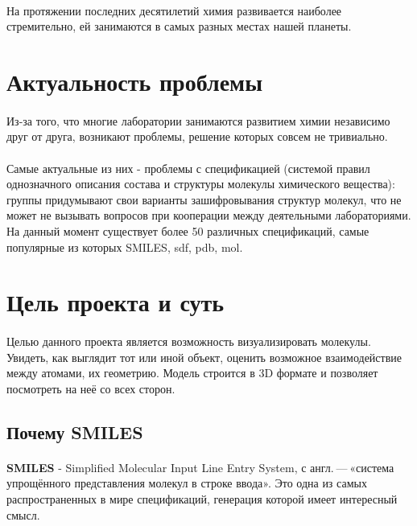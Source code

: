 \documentclass[a4paper,12pt]{article}
\begin{document}
\paragraph{} На протяжении последних десятилетий химия развивается наиболее стремительно, ей занимаются в самых разных местах нашей планеты.

\section{Актуальность проблемы}
\paragraph{} Из-за того, что многие лаборатории занимаются развитием химии независимо друг от друга, возникают проблемы, решение которых совсем не тривиально. 
\paragraph{} Самые актуальные из них - проблемы с спецификацией (системой правил однозначного описания состава и структуры молекулы химического вещества): группы придумывают свои варианты зашифровывания структур молекул, что не может не вызывать вопросов при кооперации между деятельными лабораториями. На данный момент существует более 50 различных спецификаций, самые популярные из которых SMILES, sdf, pdb, mol.

\section{Цель проекта и суть}
\paragraph{} Целью данного проекта является возможность визуализировать молекулы. Увидеть, как выглядит тот или иной объект, оценить возможное взаимодействие между атомами, их геометрию. Модель строится в 3D формате и позволяет посмотреть на неё со всех сторон. 

\subsection{Почему SMILES}
\paragraph{} \textbf{SMILES} - Simplified Molecular Input Line Entry System, с англ. — «система упрощённого представления молекул в строке ввода». Это одна из самых распространенных в мире спецификаций, генерация которой имеет интересный смысл.
\end{document}
